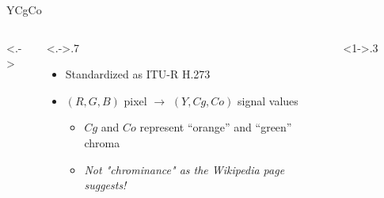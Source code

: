 \documentclass[aspectratio=169,handout,usepdftitle=false]{fireshonks}
\begin{document}
\begin{frame}{YCgCo}
    \begin{columns}<.->
        \begin{column}<.->{.7\textwidth}
            \begin{itemize}
                \item Standardized as ITU-R H.273 \parencite*{ycocg}
                \item $(R, G, B)$ pixel $\rightarrow$ $(Y, Cg, Co)$ signal values
                      \begin{itemize}
                          \item $Cg$ and $Co$ represent \enquote{orange} and \enquote{green} chroma
                          \item \emph{Not "chrominance" as the Wikipedia page suggests!}
                      \end{itemize}
            \end{itemize}
        \end{column}
        \begin{column}<1->{.3\textwidth}
            \begin{figure}

\end{figure}
\end{column}
\end{columns}
\end{frame}
\end{document}
